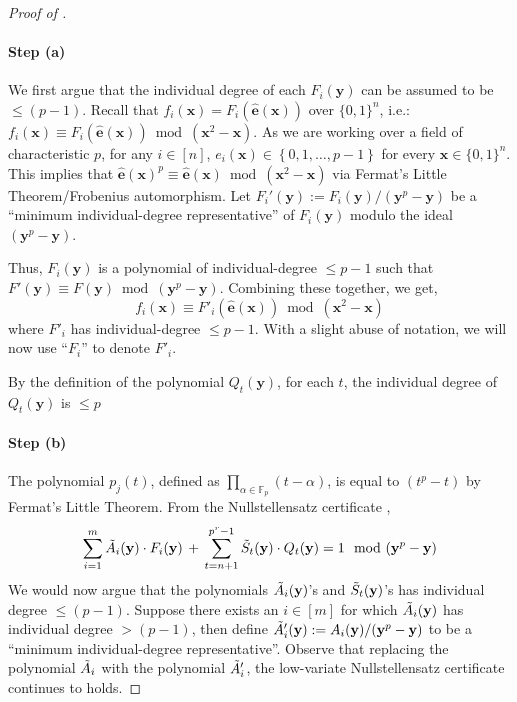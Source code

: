 \documentclass[11pt]{article}
\newcommand{\Boo}{\{0,1 \}}
\newcommand{\set}[1]{\left\{ #1 \right\}}
\newcommand{\F}{\mathbb{F}}
\begin{document}
\begin{proof}[Proof of ]
\paragraph{Step (a)}We first argue that the individual degree of each $F_i(\mathbf{y})$ can be assumed to be $\leq (p-1)$. Recall that $f_{i}(\mathbf{x}) = F_{i}(\widehat{\mathbf{e}}(\mathbf{x}))$ over $\Boo^{n}$, i.e.: $f_{i}(\mathbf{x}) \equiv F_{i}(\widehat{\mathbf{e}}(\mathbf{x}))   \bmod  (\mathbf{x}^{2} - \mathbf{x})$.\newline
As we are working over a field of characteristic $p$, for any $i \in [n]$, $e_{i}(\mathbf{x}) \in \set{0,1,\ldots,p-1}$ for every $\mathbf{x} \in \Boo^{n}$. This implies that $\widehat{\mathbf{e}}(\mathbf{x})^{p} \equiv \widehat{\mathbf{e}}(\mathbf{x}) \bmod (\mathbf{x}^{2} - \mathbf{x})$ via Fermat's Little Theorem/Frobenius automorphism.\newline
Let $F_i'(\mathbf{y}) := F_i(\mathbf{y})/(\mathbf{y}^{p} - \mathbf{y})$ be a ``minimum individual-degree representative'' of $F_i(\mathbf{y})$ modulo the ideal $(\mathbf{y}^{p} - \mathbf{y})$.

Thus, $F_i(\mathbf{y})$ is a polynomial of individual-degree $\leq p-1$ such that $F'(\mathbf{y}) \equiv F(\mathbf{y}) \bmod (\mathbf{y}^{p} - \mathbf{y})$. Combining these together, we get,
\begin{equation}
    f_{i}(\mathbf{x}) \equiv F'_{i}(\widehat{\mathbf{e}}(\mathbf{x}))   \bmod  (\mathbf{x}^{2} - \mathbf{x})
\end{equation}
where $F'_i$ has individual-degree $\leq p-1$. With a slight abuse of notation, we will now use ``$F_i$'' to denote $F'_i$. 

\noindent
By the definition of the polynomial $Q_{t}(\mathbf{y})$, for each $t$, the individual degree of $Q_{t}(\mathbf{y})$ is $\leq p$

\paragraph{Step (b)}The polynomial $p_{j}(t)$, defined as $\prod_{\alpha \in \F_{p}} (t - \alpha)$, is equal to $(t^{p} - t)$ by Fermat's Little Theorem. From the Nullstellensatz certificate ,
\begin{align*}
    \sum_{i = 1}^{m} \Tilde{A}_{i}(\mathbf{y}) \cdot F_{i}(\mathbf{y}) \, + \, \sum_{t=n+1}^{p^{r}-1} \Tilde{S}_{t}(\mathbf{y}) \cdot Q_{t}(\mathbf{y}) = 1 \mod{( \mathbf{y}^{p} - \mathbf{y} )}
\end{align*}
We would now argue that the polynomials $\Tilde{A}_{i}(\mathbf{y})$'s and $\Tilde{S}_{t}(\mathbf{y})$'s has individual degree $\leq (p-1)$. Suppose there exists an $i \in [m]$ for which $\Tilde{A}_{i}(\mathbf{y})$ has individual degree $> (p-1)$, then define $\Tilde{A}_{i}'(\mathbf{y}) := A_{i}(\mathbf{y})/(\mathbf{y}^{p} - \mathbf{y})$ to be a ``minimum individual-degree representative''. Observe that replacing the polynomial $\Tilde{A}_{i}$ with the polynomial $\Tilde{A}_{i}'$, the low-variate Nullstellensatz certificate  continues to holds.


\end{proof}
\end{document}
